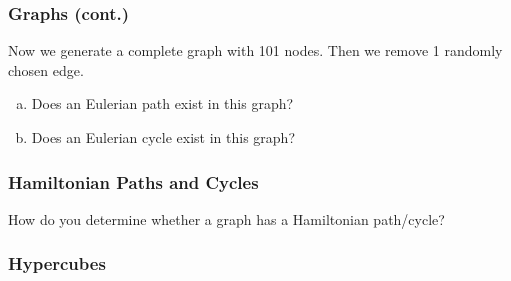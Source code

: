 \documentclass[9pt]{beamer}
\begin{document}
\begin{frame}[fragile]
  \frametitle{Graphs (cont.)}
Now we generate a complete graph with 101 nodes. Then we remove 1 randomly chosen edge.
\begin{enumerate}[(a)]
\item Does an Eulerian path exist in this graph?  
\item Does an Eulerian cycle exist in this graph?  
\end{enumerate}
\end{frame}

\begin{frame}[fragile]
  \frametitle{Hamiltonian Paths and Cycles}
How do you determine whether a graph has a Hamiltonian path/cycle? \\
\end{frame}

\begin{frame}[fragile]
  \frametitle{Hypercubes}
\end{frame}
\end{document}
